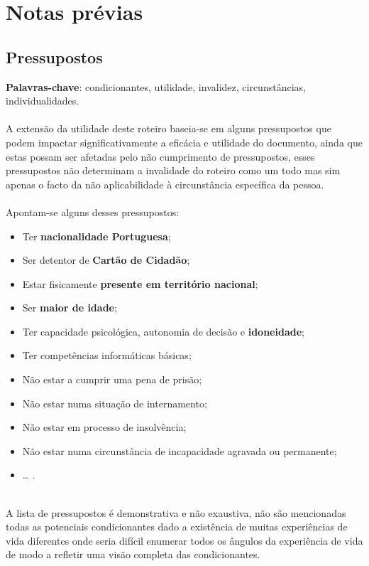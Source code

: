 
\newpage

\section{Notas prévias}

\subsection{Pressupostos}

\textbf{Palavras-chave}: condicionantes, utilidade, invalidez, circunstâncias, individualidades. \\
\\
A extensão da utilidade deste roteiro baseia-se em alguns pressupostos
que podem impactar significativamente a eficácia e utilidade do
documento, ainda que estas possam ser afetadas pelo não cumprimento de
pressupostos, esses pressupostos não determinam a invalidade do roteiro
como um todo mas sim apenas o facto da não aplicabilidade à
circunstância específica da pessoa. \\
\\
Apontam-se alguns desses pressupostos:
\begin{itemize}
	\item Ter \textbf{nacionalidade Portuguesa};
	\item Ser detentor de \textbf{Cartão de Cidadão};
	\item Estar fisicamente \textbf{presente em território nacional};
	\item Ser \textbf{maior de idade};
	\item Ter capacidade psicológica, autonomia de decisão e \textbf{idoneidade};
	\item Ter competências informáticas básicas;
	\item Não estar a cumprir uma pena de prisão;
	\item Não estar numa situação de internamento;
	\item Não estar em processo de insolvência;
	\item Não estar numa circunstância de incapacidade agravada ou permanente;
	\item \ldots{} .
\end{itemize}
\leavevmode\\
A lista de pressupostos é demonstrativa e não exaustiva, não são
mencionadas todas as potenciais condicionantes dado a existência de
muitas experiências de vida diferentes onde seria difícil enumerar todos
os ângulos da experiência de vida de modo a refletir uma visão completa
das condicionantes.

